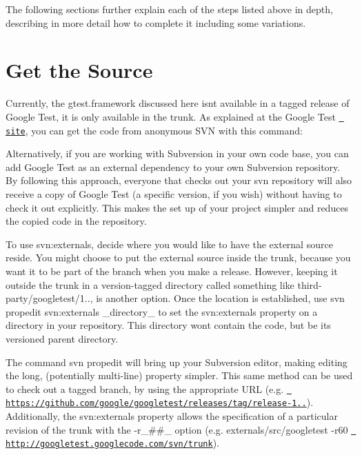 The following sections further explain each of the steps listed above in depth, describing in more detail how to complete it including some variations.

\section*{Get the Source}

Currently, the gtest.\+framework discussed here isn\textquotesingle{}t available in a tagged release of Google Test, it is only available in the trunk. As explained at the Google Test \href{https://github.com/google/googletest}{\texttt{ site}}, you can get the code from anonymous S\+VN with this command\+:


\begin{DoxyCode}{0}
\end{DoxyCode}


Alternatively, if you are working with Subversion in your own code base, you can add Google Test as an external dependency to your own Subversion repository. By following this approach, everyone that checks out your svn repository will also receive a copy of Google Test (a specific version, if you wish) without having to check it out explicitly. This makes the set up of your project simpler and reduces the copied code in the repository.

To use {\ttfamily svn\+:externals}, decide where you would like to have the external source reside. You might choose to put the external source inside the trunk, because you want it to be part of the branch when you make a release. However, keeping it outside the trunk in a version-\/tagged directory called something like {\ttfamily third-\/party/googletest/1..}, is another option. Once the location is established, use {\ttfamily svn propedit svn\+:externals \+\_\+directory\+\_\+} to set the svn\+:externals property on a directory in your repository. This directory won\textquotesingle{}t contain the code, but be its versioned parent directory.

The command {\ttfamily svn propedit} will bring up your Subversion editor, making editing the long, (potentially multi-\/line) property simpler. This same method can be used to check out a tagged branch, by using the appropriate U\+RL (e.\+g. {\ttfamily \href{https://github.com/google/googletest/releases/tag/release-1.0.1}{\texttt{ https\+://github.\+com/google/googletest/releases/tag/release-\/1..}}}). Additionally, the svn\+:externals property allows the specification of a particular revision of the trunk with the {\ttfamily -\/r\+\_\+\#\#\+\_\+} option (e.\+g. {\ttfamily externals/src/googletest -\/r60 \href{http://googletest.googlecode.com/svn/trunk}{\texttt{ http\+://googletest.\+googlecode.\+com/svn/trunk}}}).

